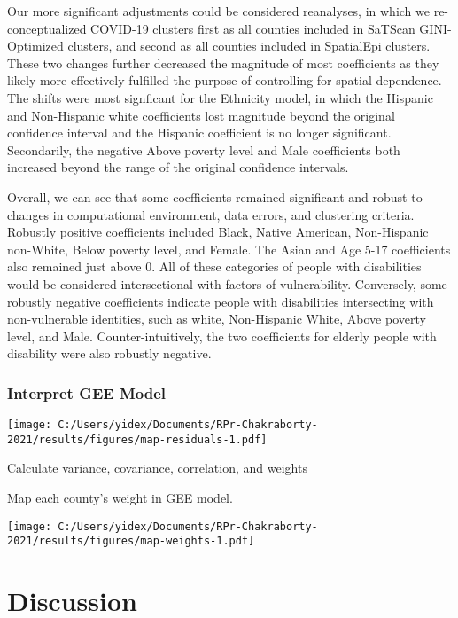 \documentclass[
]{article}
\begin{document}
Our more significant adjustments could be considered reanalyses, in
which we re-conceptualized COVID-19 clusters first as all counties
included in SaTScan GINI-Optimized clusters, and second as all counties
included in SpatialEpi clusters. These two changes further decreased the
magnitude of most coefficients as they likely more effectively fulfilled
the purpose of controlling for spatial dependence. The shifts were most
signficant for the Ethnicity model, in which the Hispanic and
Non-Hispanic white coefficients lost magnitude beyond the original
confidence interval and the Hispanic coefficient is no longer
significant. Secondarily, the negative Above poverty level and Male
coefficients both increased beyond the range of the original confidence
intervals.

Overall, we can see that some coefficients remained significant and
robust to changes in computational environment, data errors, and
clustering criteria. Robustly positive coefficients included Black,
Native American, Non-Hispanic non-White, Below poverty level, and
Female. The Asian and Age 5-17 coefficients also remained just above 0.
All of these categories of people with disabilities would be considered
intersectional with factors of vulnerability. Conversely, some robustly
negative coefficients indicate people with disabilities intersecting
with non-vulnerable identities, such as white, Non-Hispanic White, Above
poverty level, and Male. Counter-intuitively, the two coefficients for
elderly people with disability were also robustly negative.

\hypertarget{interpret-gee-model}{%
\subsubsection{Interpret GEE Model}\label{interpret-gee-model}}

\texttt{[image: C:/Users/yidex/Documents/RPr-Chakraborty-2021/results/figures/map-residuals-1.pdf]}

Calculate variance, covariance, correlation, and weights

Map each county's weight in GEE model.

\texttt{[image: C:/Users/yidex/Documents/RPr-Chakraborty-2021/results/figures/map-weights-1.pdf]}

\hypertarget{discussion}{%
\section{Discussion}\label{discussion}}
\end{document}
